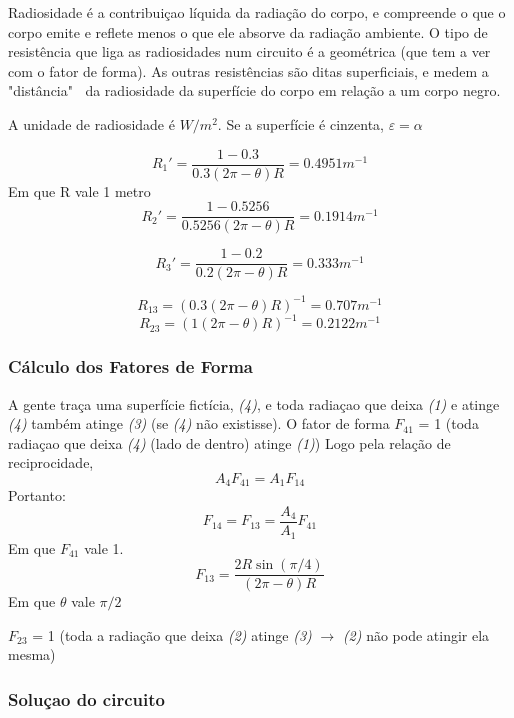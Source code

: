 Radiosidade é a contribuiçao líquida da radiação do corpo, e compreende o que o corpo emite e reflete menos o que ele absorve da radiação ambiente. O tipo de resistência que liga as radiosidades num circuito é a geométrica (que tem a ver com o fator de forma). As outras resistências são ditas superficiais, e medem a "distância" $\ $ da radiosidade da superfície do corpo em relação a um corpo negro.

A unidade de radiosidade é $W/m^{2}$. Se a superfície é cinzenta, $\varepsilon = \alpha$



\[R_{1}' = \frac{1-0.3}{0.3 (2 \pi - \theta )R} = 0.4951 m^{-1}\]
Em que R vale 1 metro
\[R_{2}' = \frac{1-0.5256}{0.5256 (2 \pi - \theta )R} = 0.1914 m^{-1}\]

\[R_{3}' = \frac{1-0.2}{0.2 (2 \pi - \theta )R} = 0.333 m^{-1}\]

\[R_{13} = (0.3 (2 \pi - \theta )R)^{-1} = 0.707 m^{-1}\]
\[R_{23} = (1 (2 \pi - \theta )R)^{-1} = 0.2122 m^{-1} \]

\subsubsection{Cálculo dos Fatores de Forma}
A gente traça uma superfície fictícia, \textit{(4)}, e toda radiaçao que deixa \textit{(1)} e atinge \textit{(4)} também atinge \textit{(3)} (se \textit{(4)} não existisse).
O fator de forma $F_{41}$ = 1 (toda radiaçao que deixa \textit{(4)} (lado de dentro) atinge \textit{(1)})
Logo pela relação de reciprocidade,  
\[A_{4}F_{41} = A_{1}F_{14}\]
Portanto:
\[F_{14} = F_{13} = \frac{A_{4}}{A_{1}} F_{41}\]
Em que $F_{41}$ vale 1. 
\[F_{13} = \frac{2R\sin(\pi / 4) }{(2 \pi - \theta )R}\]
Em que $\theta$ vale $\pi /2$
 
$F_{23}$ = 1  (toda a radiação que deixa \textit{(2)} atinge \textit{(3)} $\rightarrow$ \textit{(2)} não pode atingir ela mesma)

\subsubsection{Soluçao do circuito}


